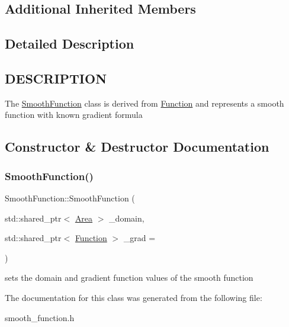\subsection*{Additional Inherited Members}


\subsection{Detailed Description}
\hypertarget{function_8h_DESCRIPTION}{}\subsection{D\+E\+S\+C\+R\+I\+P\+T\+I\+ON}\label{function_8h_DESCRIPTION}
The \hyperlink{class_smooth_function}{Smooth\+Function} class is derived from \hyperlink{class_function}{Function} and represents a smooth function with known gradient formula 

\subsection{Constructor \& Destructor Documentation}
\mbox{\label{class_smooth_function_aef997deb82c58de84cefd6559faa563b}} 
\subsubsection{\texorpdfstring{Smooth\+Function()}{SmoothFunction()}}
{\footnotesize\ttfamily Smooth\+Function\+::\+Smooth\+Function (\begin{DoxyParamCaption}\item[{std\+::shared\+\_\+ptr$<$ \hyperlink{class_area}{Area} $>$}]{\+\_\+domain,  }\item[{std\+::shared\+\_\+ptr$<$ \hyperlink{class_function}{Function} $>$}]{\+\_\+grad = {} }\end{DoxyParamCaption})\hspace{0.3cm}{\ttfamily [inline]}}

sets the domain and gradient function values of the smooth function 

The documentation for this class was generated from the following file\+:\begin{DoxyCompactItemize}
\item 
smooth\+\_\+function.\+h\end{DoxyCompactItemize}
